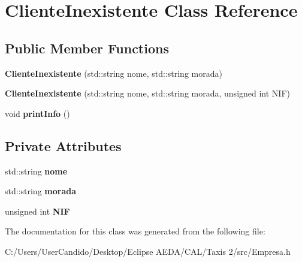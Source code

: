 \hypertarget{class_cliente_inexistente}{}\section{Cliente\+Inexistente Class Reference}
\label{class_cliente_inexistente}
\subsection*{Public Member Functions}
\begin{DoxyCompactItemize}
\item 
\hypertarget{class_cliente_inexistente_af0451741cd6c658bfe981c2589ca6285}{}\label{class_cliente_inexistente_af0451741cd6c658bfe981c2589ca6285} 
{\bfseries Cliente\+Inexistente} (std\+::string nome, std\+::string morada)
\item 
\hypertarget{class_cliente_inexistente_a0792c70fde5b7f2e29ccad035acaa7b8}{}\label{class_cliente_inexistente_a0792c70fde5b7f2e29ccad035acaa7b8} 
{\bfseries Cliente\+Inexistente} (std\+::string nome, std\+::string morada, unsigned int N\+IF)
\item 
\hypertarget{class_cliente_inexistente_a41daf5a590224c14a40329686ff2e0e6}{}\label{class_cliente_inexistente_a41daf5a590224c14a40329686ff2e0e6} 
void {\bfseries print\+Info} ()
\end{DoxyCompactItemize}
\subsection*{Private Attributes}
\begin{DoxyCompactItemize}
\item 
\hypertarget{class_cliente_inexistente_acb18f88084236fd6ecfc9af59605c4d8}{}\label{class_cliente_inexistente_acb18f88084236fd6ecfc9af59605c4d8} 
std\+::string {\bfseries nome}
\item 
\hypertarget{class_cliente_inexistente_a562fb3314372bea473711dc6b50641d8}{}\label{class_cliente_inexistente_a562fb3314372bea473711dc6b50641d8} 
std\+::string {\bfseries morada}
\item 
\hypertarget{class_cliente_inexistente_ad64664c5a6ac9cf9f4b5d3991ddbb7fd}{}\label{class_cliente_inexistente_ad64664c5a6ac9cf9f4b5d3991ddbb7fd} 
unsigned int {\bfseries N\+IF}
\end{DoxyCompactItemize}


The documentation for this class was generated from the following file\+:\begin{DoxyCompactItemize}
\item 
C\+:/\+Users/\+User\+Candido/\+Desktop/\+Eclipse A\+E\+D\+A/\+C\+A\+L/\+Taxis 2/src/Empresa.\+h\end{DoxyCompactItemize}
